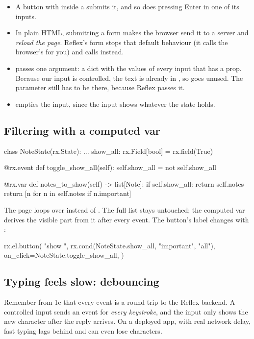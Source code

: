 \begin{itemize}
\item A button with  inside a  submits it, and so does pressing Enter in one of its inputs.
\item In plain HTML, submitting a form makes the browser send it to a server and \emph{reload the page}. Reflex's form stops that default behaviour (it calls the browser's  for you) and calls  instead.
\item {} passes one argument: a dict with the values of every input that has a  prop. Because our input is controlled, the text is already in , so  goes unused. The parameter still has to be there, because Reflex passes it.
\item {} empties the input, since the input shows whatever the state holds.
\end{itemize}

\subsection{Filtering with a computed var}

\begin{py}
class NoteState(rx.State):
	...
	show_all: rx.Field[bool] = rx.field(True)

	@rx.event
	def toggle_show_all(self):
		self.show_all = not self.show_all

	@rx.var
	def notes_to_show(self) -> list[Note]:
		if self.show_all:
			return self.notes
		return [n for n in self.notes if n.important]
\end{py}

The page loops over  instead of . The full list stays untouched; the computed var derives the visible part from it after every event. The button's label changes with :

\begin{py}
rx.el.button(
	"show ",
	rx.cond(NoteState.show_all, "important", "all"),
	on_click=NoteState.toggle_show_all,
)
\end{py}

\subsection{Typing feels slow: debouncing}

Remember from 1c that every event is a round trip to the Reflex backend. A controlled input sends an event for \emph{every keystroke}, and the input only shows the new character after the reply arrives. On a deployed app, with real network delay, fast typing lags behind and can even lose characters.


